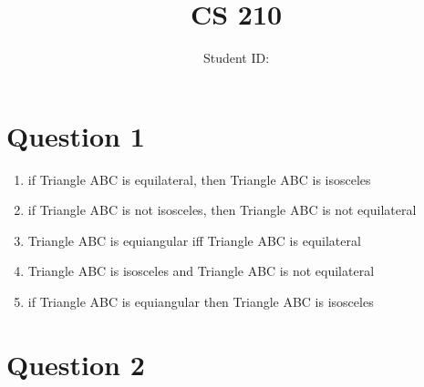 \documentclass[twoside]{article}
\title{CS 210 \hwNo}
\author{\myname \qquad Student ID:\myid}
\date{\currentdate}
\begin{document}
\maketitle

\section{Question 1}

\begin{enumerate}
    \item if Triangle ABC is equilateral, then Triangle ABC is isosceles 
    \item if Triangle ABC is not isosceles, then Triangle ABC is not equilateral
    \item Triangle ABC is equiangular iff Triangle ABC is equilateral
    \item Triangle ABC is isosceles and Triangle ABC is not equilateral
    \item if Triangle ABC is equiangular then Triangle ABC is isosceles
\end{enumerate}

\section{Question 2}
\end{document}
